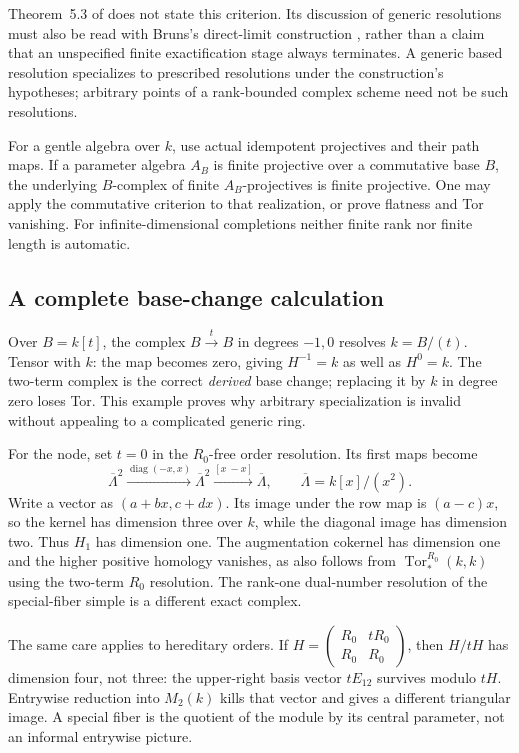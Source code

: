 Theorem~5.3 of \cite{S3} does not state this criterion. Its discussion of generic resolutions must also be read with Bruns's direct-limit construction \cite{Bruns}, rather than a claim that an unspecified finite exactification stage always terminates. A generic based resolution specializes to prescribed resolutions under the construction's hypotheses; arbitrary points of a rank-bounded complex scheme need not be such resolutions.

For a gentle algebra over $k$, use actual idempotent projectives and their path maps. If a parameter algebra $A_B$ is finite projective over a commutative base $B$, the underlying $B$-complex of finite $A_B$-projectives is finite projective. One may apply the commutative criterion to that realization, or prove flatness and Tor vanishing. For infinite-dimensional completions neither finite rank nor finite length is automatic.

\subsection{A complete base-change calculation}
Over $B=k[t]$, the complex $B\xrightarrow{t}B$ in degrees $-1,0$ resolves $k=B/(t)$. Tensor with $k$: the map becomes zero, giving $H^{-1}=k$ as well as $H^0=k$. The two-term complex is the correct \emph{derived} base change; replacing it by $k$ in degree zero loses Tor. This example proves why arbitrary specialization is invalid without appealing to a complicated generic ring.

For the node, set $t=0$ in the $R_0$-free order resolution. Its first maps become
\[
 \overline\Lambda^2\xrightarrow{\operatorname{diag}(-x,x)}\overline\Lambda^2
 \xrightarrow{[x\ -x]}\overline\Lambda,
 \qquad\overline\Lambda=k[x]/(x^2).
\]
Write a vector as $(a+bx,c+dx)$. Its image under the row map is $(a-c)x$, so the kernel has dimension three over $k$, while the diagonal image has dimension two. Thus $H_1$ has dimension one. The augmentation cokernel has dimension one and the higher positive homology vanishes, as also follows from $\operatorname{Tor}^{R_0}_*(k,k)$ using the two-term $R_0$ resolution. The rank-one dual-number resolution of the special-fiber simple is a different exact complex.

The same care applies to hereditary orders. If $H=\left(\begin{smallmatrix}R_0&tR_0\\R_0&R_0\end{smallmatrix}\right)$, then $H/tH$ has dimension four, not three: the upper-right basis vector $tE_{12}$ survives modulo $tH$. Entrywise reduction into $M_2(k)$ kills that vector and gives a different triangular image. A special fiber is the quotient of the module by its central parameter, not an informal entrywise picture.

